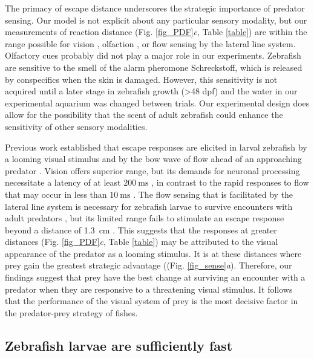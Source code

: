 \documentclass[]{rsos}%
\begin{document}
The primacy of escape distance underscores the strategic importance of predator sensing. 
Our model is not explicit about any particular sensory modality, but our measurements of reaction distance (Fig. \ref{fig_PDF}\textit{c}, Table \ref{table}) are within the range possible for vision \cite{Dunn:2016jt}, olfaction \cite{Waldman:1982ic}, or flow sensing by the lateral line system.
Olfactory cues probably did not play a major role in our experiments. 
Zebrafish are sensitive to the smell of the alarm pheromone Schreckstoff, which is released by conspecifics when the skin is damaged. 
However, this sensitivity is not acquired until a later stage in zebrafish growth (>48 dpf) \cite{Waldman:1982ic} and the water in our experimental aquarium was changed between trials.
Our experimental design does allow for the possibility that the scent of adult zebrafish could enhance the sensitivity of other sensory modalities.

Previous work established that escape responses are elicited in larval zebrafish by a looming visual stimulus \cite{Bianco:2011ca} and by the bow wave of flow ahead of an approaching predator \cite{Stewart:2014cma}.
Vision offers superior range, but its demands for neuronal processing necessitate a latency of at least $\SI{200}{\ms}$ \cite{Burgess:2007vp}, in contrast to the rapid responses to flow that may occur in less than $\SI{10}{\ms}$  \cite{Liu:1999fs}.
The flow sensing that is facilitated by the lateral line system is necessary for zebrafish larvae to survive encounters with adult predators \cite{Stewart:2013bha}, but its limited range fails to stimulate an escape response beyond a distance of \SI{1.3}{\cm} \cite{Stewart:2014cma}.
This suggests that the responses at greater distances (Fig. \ref{fig_PDF}\textit{c}, Table \ref{table}) may be attributed to the visual appearance of the predator as a looming stimulus. 
It is at these distances where prey gain the greatest strategic advantage ((Fig. \ref{fig_sense}\textit{a}).
Therefore, our findings suggest that prey have the best change at surviving an encounter with a predator when they are responsive to a threatening visual stimulus.
It follows that the performance of the visual system of prey is the most decisive factor in the predator-prey strategy of fishes.


\subsection{Zebrafish larvae are sufficiently fast} 
\end{document}
